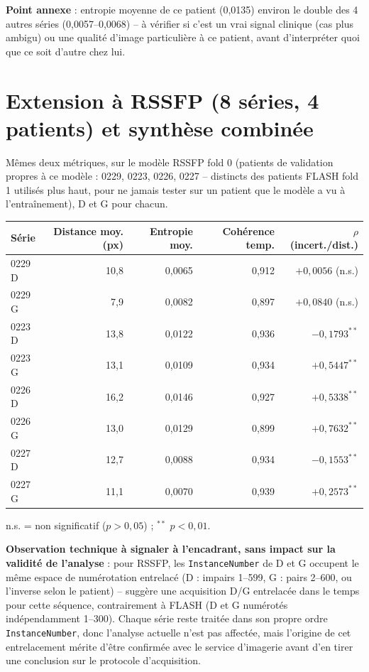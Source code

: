 \documentclass[11pt,a4paper]{report}
\begin{document}
\textbf{Point annexe} : entropie moyenne de ce patient (0,0135) environ le double
des 4 autres séries (0,0057--0,0068) -- à vérifier si c'est un vrai signal clinique
(cas plus ambigu) ou une qualité d'image particulière à ce patient, avant
d'interpréter quoi que ce soit d'autre chez lui.

\section{Extension à RSSFP (8 séries, 4 patients) et synthèse combinée}
\label{sec:phase3-rssfp}

Mêmes deux métriques, sur le modèle RSSFP fold 0 (patients de validation propres à
ce modèle : 0229, 0223, 0226, 0227 -- distincts des patients FLASH fold 1 utilisés
plus haut, pour ne jamais tester sur un patient que le modèle a vu à
l'entraînement), D et G pour chacun.

\begin{center}
\begin{tabular}{lrrrr}
\toprule
Série & Distance moy. (px) & Entropie moy. & Cohérence temp. & $\rho$ (incert./dist.) \\
\midrule
0229 D & 10,8 & 0,0065 & 0,912 & $+0{,}0056$ (n.s.) \\
0229 G & 7,9  & 0,0082 & 0,897 & $+0{,}0840$ (n.s.) \\
0223 D & 13,8 & 0,0122 & 0,936 & $-0{,}1793^{**}$ \\
0223 G & 13,1 & 0,0109 & 0,934 & $+0{,}5447^{**}$ \\
0226 D & 16,2 & 0,0146 & 0,927 & $+0{,}5338^{**}$ \\
0226 G & 13,0 & 0,0129 & 0,899 & $+0{,}7632^{**}$ \\
0227 D & 12,7 & 0,0088 & 0,934 & $-0{,}1553^{**}$ \\
0227 G & 11,1 & 0,0070 & 0,939 & $+0{,}2573^{**}$ \\
\bottomrule
\end{tabular}
\end{center}
{\footnotesize n.s. = non significatif ($p>0{,}05$) ; $^{**}$ $p<0{,}01$.}

\textbf{Observation technique à signaler à l'encadrant, sans impact sur la validité
de l'analyse} : pour RSSFP, les \texttt{InstanceNumber} de D et G occupent le même
espace de numérotation entrelacé (D : impairs 1--599, G : pairs 2--600, ou
l'inverse selon le patient) -- suggère une acquisition D/G entrelacée dans le temps
pour cette séquence, contrairement à FLASH (D et G numérotés indépendamment
1--300). Chaque série reste traitée dans son propre ordre \texttt{InstanceNumber},
donc l'analyse actuelle n'est pas affectée, mais l'origine de cet entrelacement
mérite d'être confirmée avec le service d'imagerie avant d'en tirer une conclusion
sur le protocole d'acquisition.
\end{document}
